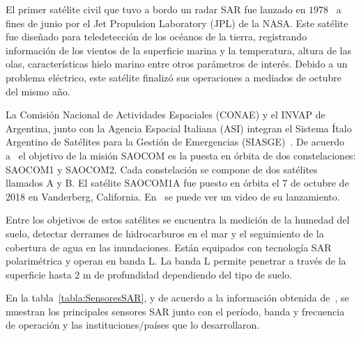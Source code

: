 El primer satélite civil que tuvo a bordo un radar SAR fue lanzado en $1978$~\cite{Seasat} a fines de junio por el Jet Propulsion Laboratory (JPL) de la NASA. Este satélite fue diseñado para teledetección de los océanos de la tierra, registrando información de los vientos de la superficie marina y la temperatura, altura de las olas, características hielo marino entre otros parámetros de interés. Debido a un problema eléctrico, este satélite finalizó sus operaciones a mediados de octubre del mismo año.


La Comisión Nacional de Actividades Espaciales (CONAE) y el INVAP de Argentina, junto con la Agencia Espacial Italiana (ASI) integran el Sistema Ítalo Argentino de Satélites para la Gestión de Emergencias (SIASGE)~\cite{Invap}. De acuerdo a~\cite{Saocom} el objetivo de la misión SAOCOM es la puesta en órbita de dos constelaciones: SAOCOM1 y SAOCOM2. Cada constelación se compone de dos satélites llamados A y B. El satélite SAOCOM1A fue puesto en órbita el 7 de octubre de 2018 en Vanderberg, California. En~\cite{Saocom} se puede ver un video de su lanzamiento.

Entre los objetivos de estos satélites se encuentra la medición de la humedad del suelo, detectar derrames de hidrocarburos en el mar y el seguimiento de la cobertura de agua en las inundaciones. Están equipados con tecnología SAR polarimétrica y operan en banda L. La banda L permite penetrar a través de la superficie hasta $2$ m de profundidad dependiendo del tipo de suelo. 

En la tabla~\ref{tabla:SensoresSAR}, y de acuerdo a la información obtenida de~\cite{Moreira2013}, se muestran los principales sensores SAR junto con el período, banda y frecuencia de operación y las instituciones/países que lo desarrollaron. 

